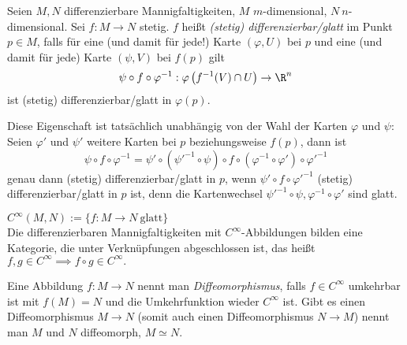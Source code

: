 \addtocounter{thm}{1}\lecture
\begin{defn}
	Seien $M,N$ differenzierbare Mannigfaltigkeiten, $M$ $m$-dimensional, $N\ n$-dimensional. Sei $ f: M \to N $  stetig. $f$ heißt \emph{(stetig) differenzierbar/glatt} im Punkt $p \in M$, falls für eine (und damit für jede!) Karte $ (\varphi,U) $ bei $p$ und eine (und damit für jede) Karte $ (\psi,V) $ bei $f(p)$ gilt
	\[ \psi \circ f \circ \varphi^{-1}: \varphi \left( f^{-1}(V) \cap U \right) \to \R^n \]
	ist (stetig) differenzierbar/glatt in $\varphi(p).$
\end{defn}

Diese Eigenschaft ist tatsächlich unabhängig von der Wahl der Karten $\varphi$ und $\psi$: Seien $ \varphi' $ und $\psi'$ weitere Karten bei $p$ beziehungsweise $f(p)$, dann ist 
\[ \psi \circ f \circ \varphi^{-1} = \psi' \circ \left( \psi'^{-1} \circ \psi \right) \circ f \circ \left( \varphi^{-1} \circ \varphi' \right) \circ \varphi'^{-1} \]
genau dann (stetig) differenzierbar/glatt in $p$, wenn $\psi' \circ f \circ \varphi'^{-1}$ (stetig) differenzierbar/glatt in $p$ ist, denn die Kartenwechsel $\psi'^{-1} \circ \psi, \varphi^{-1} \circ \varphi'$ sind glatt.

\begin{rem*}
	$ C^\infty (M,N) := \{ f: M \to N \ \text{glatt}\} $\\
	Die differenzierbaren Mannigfaltigkeiten mit $C^\infty$-Abbildungen bilden eine Kategorie, die unter Verknüpfungen abgeschlossen ist, das heißt $ f, g \in C^\infty \implies f \circ g \in C^\infty. $
\end{rem*}

\begin{defn}[Diffeomorphismus]
	Eine Abbildung $ f: M \to N $ nennt man \emph{Diffeomorphismus}, falls $ f \in C^\infty $ umkehrbar ist mit $ f(M)=N $ und die Umkehrfunktion wieder $C^\infty$ ist. Gibt es einen Diffeomorphismus $ M \to N $ (somit auch einen Diffeomorphismus $N \to M$) nennt man $M$ und $N$ diffeomorph, $M \simeq N$.
\end{defn}

